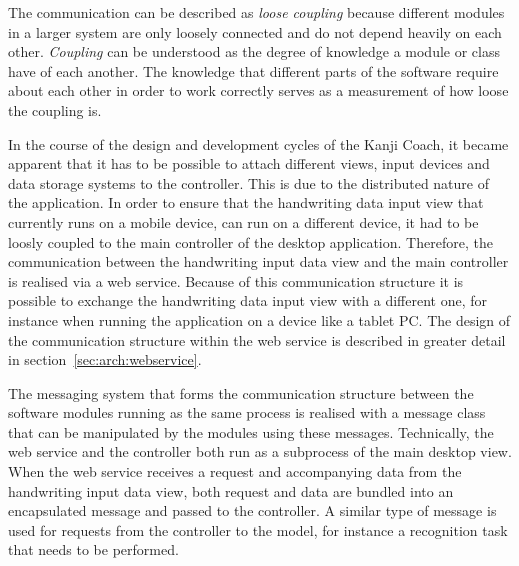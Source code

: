 The communication can be described as \emph{loose coupling} because different 
modules  in a larger system are only loosely connected and do not depend 
heavily on each other. \emph{Coupling} can be understood as the degree 
of knowledge a module or class have of each another. 
The knowledge that different parts of the software
require about each other in order to work correctly serves as a measurement of
how loose the coupling is.

In the course of the design and development cycles of the Kanji Coach, 
it became apparent that it has to be possible to attach different views, 
input devices and data storage systems to the controller. This is due to the 
distributed nature of the application. 
In order to ensure that the handwriting data input view that currently runs 
on a mobile device, can run on a different device, it had to be loosly coupled 
to the main controller of the desktop application. 
Therefore, the communication between the handwriting 
input data view and the main controller is realised via a web service. 
Because of this communication structure it is possible to exchange the 
handwriting data input view with a different one, for instance when running 
the application on a device like a tablet PC. The design of the communication 
structure within the web service is described in greater detail 
in section~\ref{sec:arch:webservice}.

The messaging system that forms the communication structure between the software 
modules running as the same process is realised with a message class that
can be manipulated by the modules using these messages.
Technically, the web service and the controller both run as a subprocess of the 
main desktop view. When the web service receives a request and accompanying data
from the handwriting input data view, both request and data are bundled into an 
encapsulated message and passed to the controller. A similar type of message 
is used for requests from the controller to the model, for instance a recognition
task that needs to be performed.



